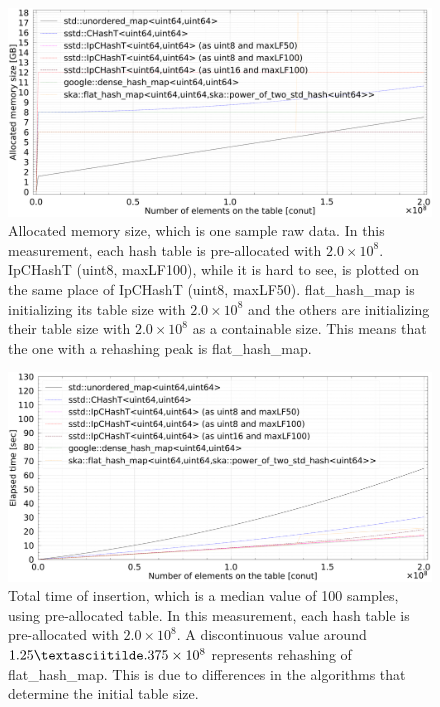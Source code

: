 \begin{figure}[h]
  \hspace{-1mm}
  \includegraphics[scale=0.24]{./fig_bench/usedMemory_preAlloc.pdf}
  \caption{
    Allocated memory size, which is one sample raw data.
    In this measurement, each hash table is pre-allocated with $2.0\times10^8$.
    IpCHashT (uint8, maxLF100), while it is hard to see, is plotted on the same place of IpCHashT (uint8, maxLF50).
    flat\_hash\_map is initializing its table size with $2.0\times10^8$ and the others are initializing their table size with $2.0\times10^8$ as a containable size.
    This means that the one with a rehashing peak is flat\_hash\_map.
  }
  \label{fig_bench_memory_preAlloc}
\end{figure}


\begin{figure}[h]
  \includegraphics[scale=0.24]{./fig_bench/insert_et_preAlloc_med.pdf}
  \caption{
    Total time of insertion, which is a median value of 100 samples, using pre-allocated table.
    In this measurement, each hash table is pre-allocated with $2.0\times10^8$.
    A discontinuous value around $1.25\textasciitilde.375\times10^8$ represents rehashing of flat\_hash\_map.
    This is due to differences in the algorithms that determine the initial table size.
  }
  \label{fig_bench_insert_preAlloc}
\end{figure}


